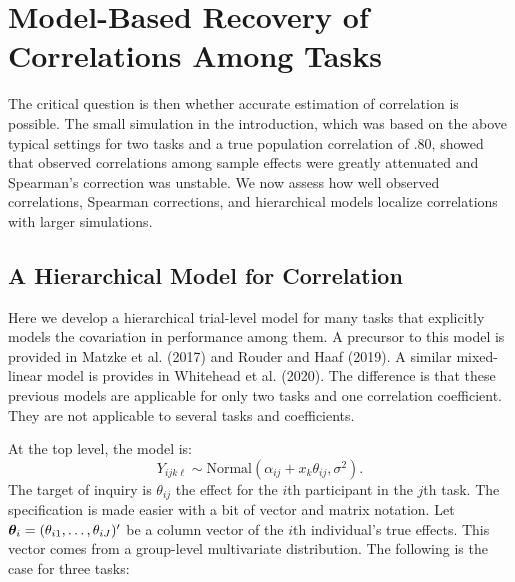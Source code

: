 \documentclass[
  ,man]{apa6}
\begin{document}
\hypertarget{model-based-recovery-of-correlations-among-tasks}{%
\section{Model-Based Recovery of Correlations Among Tasks}\label{model-based-recovery-of-correlations-among-tasks}}

The critical question is then whether accurate estimation of correlation is possible. The small simulation in the introduction, which was based on the above typical settings for two tasks and a true population correlation of .80, showed that observed correlations among sample effects were greatly attenuated and Spearman's correction was unstable. We now assess how well observed correlations, Spearman corrections, and hierarchical models localize correlations with larger simulations.

\hypertarget{a-hierarchical-model-for-correlation}{%
\subsection{A Hierarchical Model for Correlation}\label{a-hierarchical-model-for-correlation}}

Here we develop a hierarchical trial-level model for many tasks that explicitly models the covariation in performance among them. A precursor to this model is provided in Matzke et al. (2017) and Rouder and Haaf (2019). A similar mixed-linear model is provides in Whitehead et al. (2020). The difference is that these previous models are applicable for only two tasks and one correlation coefficient. They are not applicable to several tasks and coefficients.

At the top level, the model is:
\[
Y_{ijk\ell} \sim \mbox{Normal}(\alpha_{ij}+x_k\theta_{ij},\sigma^2).
\]
The target of inquiry is \(\theta_{ij}\) the effect for the \(i\)th participant in the \(j\)th task. The specification is made easier with a bit of vector and matrix notation. Let \(\bm \theta_{i}=(\theta_{i1},\ldots,\theta_{iJ})'\) be a column vector of the \(i\)th individual's true effects. This vector comes from a group-level multivariate distribution. The following is the case for three tasks:
\end{document}
